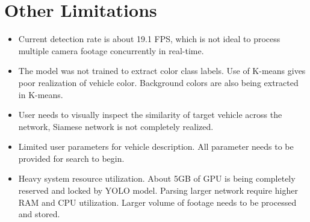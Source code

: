 \section{Other Limitations}
\begin{itemize}
	\item Current detection rate is about 19.1 FPS, which is not ideal to process multiple camera footage concurrently in real-time.
	\item The model was not trained to extract color class labels. Use of K-means gives poor realization of vehicle color. Background colors are also being extracted in K-means.
	\item User needs to visually inspect the similarity of target vehicle across the network, Siamese network is not completely realized.
	\item Limited user parameters for vehicle description. All parameter needs to be provided for search to begin.
	\item Heavy system resource utilization. About 5GB of GPU is being completely reserved and locked by YOLO model. Parsing larger network require higher RAM and CPU utilization. Larger volume of footage needs to be processed and stored.
\end{itemize}



